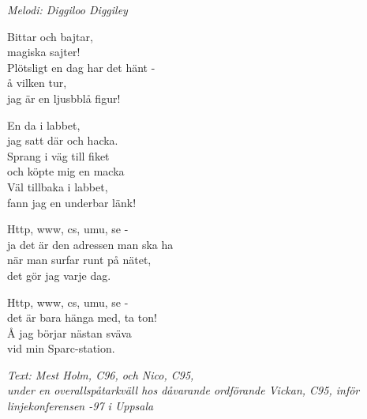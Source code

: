 {\footnotesize\textit{Melodi: Diggiloo Diggiley}}\par
\vspace{10pt}
Bittar och bajtar,\\
magiska sajter!\\
Plötsligt en dag har det hänt -\\
å vilken tur,\\
jag är en ljusbblå figur!\par
\vspace{10pt}
En da i labbet,\\
jag satt där och hacka.\\
Sprang i väg till fiket\\
och köpte mig en macka\\
Väl tillbaka i labbet,\\
fann jag en underbar länk!\par
\vspace{10pt}
Http, www, cs, umu, se -\\
ja det är den adressen man ska ha\\
när man surfar runt på nätet,\\
det gör jag varje dag.\par
\vspace{10pt}
Http, www, cs, umu, se -\\
det är bara hänga med, ta ton!\\
Å jag börjar nästan sväva\\
vid min Sparc-station.\par
\vspace{10pt}
{\footnotesize\textit{Text: Mest Holm, C96, och Nico, C95,\\
under en overallspåtarkväll hos dåvarande ordförande Vickan, C95, inför linjekonferensen -97 i Uppsala}}
